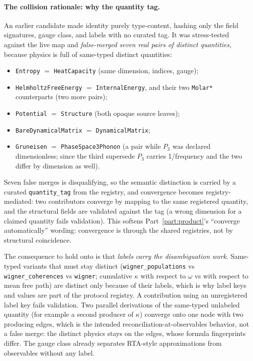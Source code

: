 \documentclass[11pt,a4paper]{article}
\begin{document}
\paragraph{The collision rationale: why the quantity tag.} An earlier candidate
made identity purely type-content, hashing only the field signatures, gauge
class, and labels with no curated tag. It was stress-tested against the live map
and \emph{false-merged seven real pairs of distinct quantities}, because physics
is full of same-typed distinct quantities:
\begin{itemize}[leftmargin=2em, itemsep=0.15em]
  \item \texttt{Entropy} $=$ \texttt{HeatCapacity} (same dimension, indices, gauge);
  \item \texttt{HelmholtzFreeEnergy} $=$ \texttt{InternalEnergy}, and their two
        \texttt{Molar*} counterparts (two more pairs);
  \item \texttt{Potential} $=$ \texttt{Structure} (both opaque source leaves);
  \item \texttt{BareDynamicalMatrix} $=$ \texttt{DynamicalMatrix};
  \item \texttt{Gruneisen} $=$ \texttt{PhaseSpace3Phonon} (a pair while $P_3$ was
        declared dimensionless; since the third supersede $P_3$ carries
        1/frequency and the two differ by dimension as well).
\end{itemize}
Seven false merges is disqualifying, so the semantic distinction is carried by a
curated \texttt{quantity\_tag} from the registry, and convergence becomes
registry-mediated: two contributors converge by mapping to the same registered
quantity, and the structural fields are validated against the tag (a wrong
dimension for a claimed quantity fails validation). This softens
Part~\ref{part:product}'s ``converge automatically'' wording: convergence is
through the shared registries, not by structural coincidence.

The consequence to hold onto is that \emph{labels carry the disambiguation work}.
Same-typed variants that must stay distinct
(\texttt{wigner\_populations} vs \texttt{wigner\_coherences} vs \texttt{wigner};
cumulative $\kappa$ with respect to $\omega$ vs with respect to mean free path)
are distinct only because of their labels, which is why label keys and values are
part of the protocol registry. A contribution using an unregistered label key
fails validation. Two parallel derivations of the same-typed unlabeled quantity
(for example a second producer of $\kappa$) converge onto one node with two
producing edges, which is the intended reconciliation-at-observables behavior, not
a false merge: the distinct physics stays on the edges, whose formula fingerprints
differ. The gauge class already separates RTA-style approximations from
observables without any label.
\end{document}
